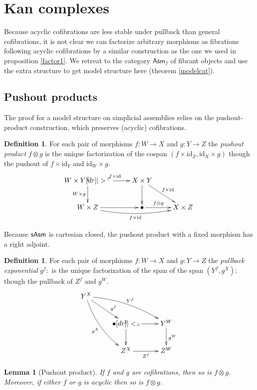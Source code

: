 \documentclass{amsart}
\theoremstyle{plain}
\newtheorem{lemma}[theorem]{Lemma}
\theoremstyle{definition}
\newtheorem{defin}[theorem]{Definition}
\newcommand\id{\mathrm{id}}
\newcommand\Asm{\mathsf{Asm}}
\begin{document}
\section{Kan complexes}
Because acyclic cofibrations are less stable under pullback than general cofibrations, it is not clear we can factorize arbitrary morphisms as fibrations following acyclic cofibrations by a similar construction as the one we used in proposition \ref{factor1}. We retreat to the category $\Asm_{f}$ of fibrant objects and use the extra structure to get model structure here (theorem \ref{modelcat}).

\subsection{Pushout products}
The proof for a model structure on simplicial assemblies relies on the pushout-product construction, which preserves (acyclic) cofibrations.

\begin{defin} For each pair of morphisms $f:W\to X$ and $g:Y\to Z$ the \emph{pushout product} $f\otimes g$ is the unique factorization of the cospan $(f\times \id_Z , \id_X\times g)$ though the pushout of $f\times \id_Y$ and $\id_W\times g$. 
\[\xymatrix{
W\times Y \ar[r]^{f\times \id} \ar[d]_{W\times g} \po & X\times Y \ar[d] \ar[dr]^{f\times \id} \\
W\times Z \ar[r] \ar@/_2ex/[rr]_{f\times\id} & \bullet \ar[r]^(.4){f\otimes g} & X\times Z
}\]
\end{defin}

Because $\mathsf{sAsm}$ is cartesian closed, the pushout product with a fixed morphism has a right adjoint.

\begin{defin} For each pair of morphisms $f:W\to X$ and $g:Y\to Z$ the \emph{pullback exponential} $g^f: $ is the unique factorization of the span of the span $(Y^f, g^X): $ though the pullback of $Z^f$ and $g^W$. 
\[\xymatrix{
Y^X \ar@/^2ex/[drr]^{Y^f} \ar@/_2ex/[ddr]_{g^X}\ar[dr]^(.6){g^f} \\
& \bullet \ar[r]\ar[d]\pb & Y^W \ar[d]^{g^W} \\
& Z^X \ar[r]_{Z^f} & Z^W
}\]
\end{defin}

\begin{lemma}[Pushout product] If $f$ and $g$ are cofibrations, then so is $f\otimes g$. Moreover, if either $f$ or $g$ is acyclic then so is $f\otimes g$. \label{pushprod} \end{lemma}
\end{document}
